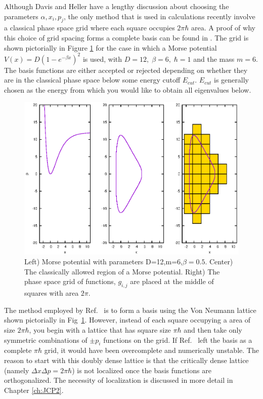 {Although Davis and Heller have a lengthy discussion about choosing the parameters $\alpha,x_i,p_j$, the only method that is used in calculations recently involve a classical phase space grid\cite{Halverson2012,Shimshovitz2012} where each square occupies $2\pi\hbar$ area.  A proof of why this choice of grid spacing forms a complete basis can be found in . The grid is shown pictorially in Figure \ref{fig.morse} for the case in which a Morse potential $V\left(x\right)=D\left(1-e^{-\beta x}\right)^2$ is used, with $D=12,\;\beta=6,\;\hbar=1$ and the mass $m=6$.  The basis functions are either accepted or rejected depending on whether they are in the classical phase space below some energy cutoff $E_{cut}$. $E_{cut}$ is generally chosen as the energy from which you would like to obtain all eigenvalues below\cite{Halverson2012}.
\begin{figure}[!ht]
\centering
\includegraphics[width=6.5in]{morseeps}
\caption[Depiction of location of phase-space basis functions in a morse potential.]{Left) Morse potential with parameters D=12,m=6,$\beta=0.5$. Center) The classically allowed region of a Morse potential. Right) The phase space grid of functions, $g_{i,j}$ are placed at the middle of squares with area $2\pi$. } 
\label{fig.morse}
\end{figure}


The method employed by Ref.~ is to form a basis using the Von Neumann lattice shown pictorially in Fig~\ref{fig.morse}. However, instead of each square occupying a area of size $2\pi\hbar$, you begin with a lattice that has square size $\pi\hbar$ and then take only symmetric combinations of $\pm p_i$ functions on the grid.    If Ref.~ left the basis as a complete $\pi\hbar$ grid, it would have been overcomplete and numerically unstable.  The reason to start with this doubly dense lattice is that the critically dense lattice (namely $\Delta x\Delta p=2\pi\hbar$) is not localized once the basis functions are orthogonalized\cite{Poirier2004a}.  The necessity of localization is discussed in more detail in Chapter \ref{ch:JCP2}.


}
